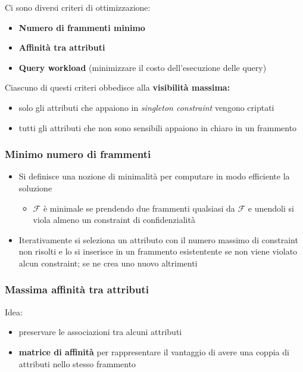 \documentclass{report}
\begin{document}
\noindent Ci sono diversi criteri di ottimizzazione:
\begin{itemize}
    \item \textbf{Numero di frammenti minimo}
    \item \textbf{Affinità tra attributi}
    \item \textbf{Query workload} (minimizzare il costo dell'esecuzione delle query)
\end{itemize}

\noindent Ciascuno di questi criteri obbedisce alla \textbf{visibilità massima:}
\begin{itemize}
    \item solo gli attributi che appaiono in \textit{singleton constraint} vengono criptati 
    \item tutti gli attributi che non sono sensibili appaiono in chiaro in un frammento
\end{itemize}

\subsubsection{Minimo numero di frammenti}
\begin{itemize}
    \item Si definisce una nozione di minimalità per computare in modo efficiente la soluzione
    \begin{itemize}
        \item $\mathcal{F}$ è minimale se prendendo due frammenti qualsiasi da $\mathcal{F}$ e unendoli si viola almeno un constraint di confidenzialità
    \end{itemize}
    \item Iterativamente si seleziona un attributo con il numero massimo di constraint non risolti e lo si inserisce 
    in un frammento esistentente se non viene violato alcun constraint; se ne crea uno nuovo altrimenti
\end{itemize}

\subsubsection{Massima affinità tra attributi}
Idea:
\begin{itemize}
    \item preservare le associazioni tra alcuni attributi 
    \item \textbf{matrice di affinità} per rappresentare il vantaggio di avere una coppia 
    di attributi nello stesso frammento
\end{itemize}
\end{document}
